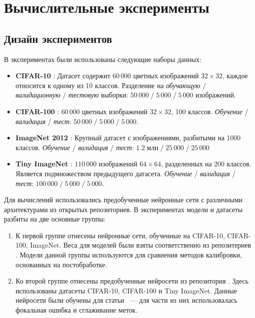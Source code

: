 \documentclass[12pt]{article}
\begin{document}
\section{Вычислительные эксперименты}\label{sec:experiments}

\subsection{Дизайн экспериментов}

В экспериментах были использованы следующие наборы данных:
\begin{itemize}
    \item \textbf{CIFAR-10} \cite{cifar}: Датасет содержит $60\,000$ цветных изображений $32\times 32$, каждое относится к одному из 10 классов. Разделение на \emph{обучающую} / \emph{валидационную} / \emph{тестовую} выборки: $50\,000\;/\;5\,000\;/\;5\,000$ изображений.
    \item \textbf{CIFAR-100} \cite{cifar}: $60\,000$ цветных изображений $32\times 32$, 100 классов. \emph{Обучение} / \emph{валидация} / \emph{тест}: $50\,000\;/\;5\,000\;/\;5\,000$.
    \item \textbf{ImageNet 2012} \cite{imagenet}: Крупный датасет с изображениями, разбитыми на 1000 классов. \emph{Обучение} / \emph{валидация} / \emph{тест}: $1.2\;\text{млн}\;/\;25\,000\;/\;25\,000$
    \item \textbf{Tiny ImageNet} \cite{imagenet}: $110\,000$ изображений $64\times 64$, разделенных на 200 классов. Является подмножеством предыдущего датасета. \emph{Обучение} / \emph{валидация} / \emph{тест}: $100\,000\;/\;5\,000\;/\;5\,000$.
\end{itemize}

Для вычислений использовались предобученные нейронные сети с различными архитектурами из открытых репозиториев. В экспериментах модели и датасеты разбиты на две основные группы:

\begin{enumerate}
    \item К первой группе отнесены нейронные сети, обученные на CIFAR-10, CIFAR-100, ImageNet. Веса для моделей были взяты соответственно из репозитериев \cite{pretrained_cifar10, pretrained_cifar100, pretrained_imagenet}. Модели данной группы используются для сравнения методов калибровки, основанных на постобработке.
    \item Ко второй группе отнесены предобученные нейросети из репозитория \cite{focal_github}. Здесь использованы датасеты CIFAR-10, CIFAR-100 и Tiny ImageNet. Данные нейросети были обучены для статьи \cite{focal_calib}~--- для части из них использовалась фокальная ошибка и сглаживание меток.
\end{enumerate}
\end{document}
